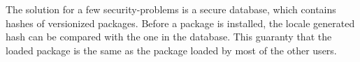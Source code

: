 




The solution for a few security-problems is a secure database, which contains hashes of versionized packages. Before a package is installed, the locale generated hash can be compared with the one in the database. This guaranty that the loaded package is the same as the package loaded by most of the other users.

